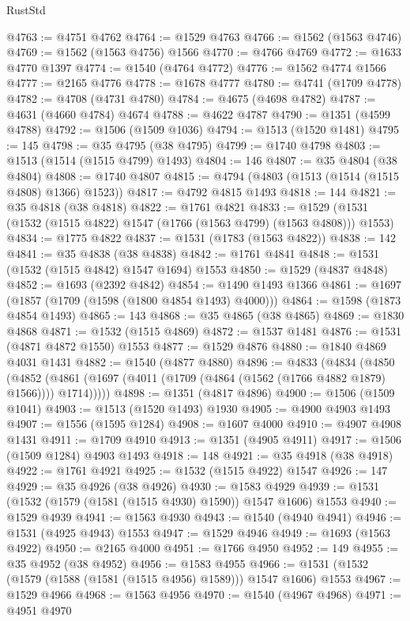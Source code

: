 \begin{lexlean}{RustStd}
\begin{coremodule}
{\begin{coremodule}
{{{{{{{{{{{{{{{{{{{{{{{{{{{{{{{{@4763 := @4751 @4762
@4764 := @1529 @4763
@4766 := @1562 (@1563 @4746)
@4769 := @1562 (@1563 @4756) @1566
@4770 := @4766 @4769
@4772 := @1633 @4770 @1397
@4774 := @1540 (@4764 @4772)
@4776 := @1562 @4774 @1566
@4777 := @2165 @4776
@4778 := @1678 @4777
@4780 := @4741 (@1709 @4778)
@4782 := @4708 (@4731 @4780)
@4784 := @4675 (@4698 @4782)
@4787 := @4631 (@4660 @4784) @4674
@4788 := @4622 @4787
@4790 := @1351 (@4599 @4788)
@4792 := @1506 (@1509 @1036)
@4794 := @1513 (@1520 @1481)
@4795 := 145
@4798 := @35 @4795 (@38 @4795)
@4799 := @1740 @4798
@4803 := @1513 (@1514 (@1515 @4799) @1493)
@4804 := 146
@4807 := @35 @4804 (@38 @4804)
@4808 := @1740 @4807
@4815 := @4794 (@4803 (@1513 (@1514 (@1515 @4808) @1366) @1523))
@4817 := @4792 @4815 @1493
@4818 := 144
@4821 := @35 @4818 (@38 @4818)
@4822 := @1761 @4821
@4833 := @1529 (@1531 (@1532 (@1515 @4822) @1547 (@1766 (@1563 @4799) (@1563 @4808))) @1553)
@4834 := @1775 @4822
@4837 := @1531 (@1783 (@1563 @4822))
@4838 := 142
@4841 := @35 @4838 (@38 @4838)
@4842 := @1761 @4841
@4848 := @1531 (@1532 (@1515 @4842) @1547 @1694) @1553
@4850 := @1529 (@4837 @4848)
@4852 := @1693 (@2392 @4842)
@4854 := @1490 @1493 @1366
@4861 := @1697 (@1857 (@1709 (@1598 (@1800 @4854 @1493) @4000)))
@4864 := @1598 (@1873 @4854 @1493)
@4865 := 143
@4868 := @35 @4865 (@38 @4865)
@4869 := @1830 @4868
@4871 := @1532 (@1515 @4869)
@4872 := @1537 @1481
@4876 := @1531 (@4871 @4872 @1550) @1553
@4877 := @1529 @4876
@4880 := @1840 @4869 @4031 @1431
@4882 := @1540 (@4877 @4880)
@4896 := @4833
    (@4834
      (@4850
        (@4852 (@4861 (@1697 (@4011 (@1709 (@4864 (@1562 (@1766 @4882 @1879) @1566)))) @1714)))))
@4898 := @1351 (@4817 @4896)
@4900 := @1506 (@1509 @1041)
@4903 := @1513 (@1520 @1493) @1930
@4905 := @4900 @4903 @1493
@4907 := @1556 (@1595 @1284)
@4908 := @1607 @4000
@4910 := @4907 @4908 @1431
@4911 := @1709 @4910
@4913 := @1351 (@4905 @4911)
@4917 := @1506 (@1509 @1284) @4903 @1493
@4918 := 148
@4921 := @35 @4918 (@38 @4918)
@4922 := @1761 @4921
@4925 := @1532 (@1515 @4922) @1547
@4926 := 147
@4929 := @35 @4926 (@38 @4926)
@4930 := @1583 @4929
@4939 := @1531 (@1532 (@1579 (@1581 (@1515 @4930) @1590)) @1547 @1606) @1553
@4940 := @1529 @4939
@4941 := @1563 @4930
@4943 := @1540 (@4940 @4941)
@4946 := @1531 (@4925 @4943) @1553
@4947 := @1529 @4946
@4949 := @1693 (@1563 @4922)
@4950 := @2165 @4000
@4951 := @1766 @4950
@4952 := 149
@4955 := @35 @4952 (@38 @4952)
@4956 := @1583 @4955
@4966 := @1531 (@1532 (@1579 (@1588 (@1581 (@1515 @4956) @1589))) @1547 @1606) @1553
@4967 := @1529 @4966
@4968 := @1563 @4956
@4970 := @1540 (@4967 @4968)
@4971 := @4951 @4970
}}}}}}}}}}}}}}}}}}}}}}}}}}}}}}}}
\end{coremodule}}
\end{coremodule}
\end{lexlean}
